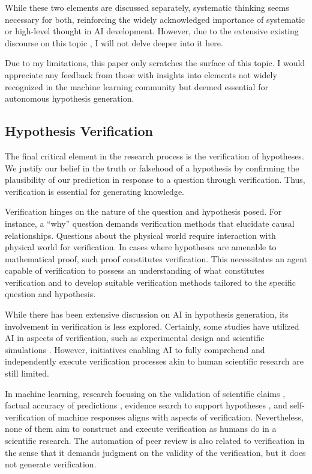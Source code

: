 \documentclass{article}
\begin{document}
While these two elements are discussed separately, systematic thinking seems necessary for both, reinforcing the widely acknowledged importance of systematic or high-level thought in AI development. However, due to the extensive existing discourse on this topic \cite{goyal2022inductive}, I will not delve deeper into it here.

Due to my limitations, this paper only scratches the surface of this topic. I would appreciate any feedback from those with insights into elements not widely recognized in the machine learning community but deemed essential for autonomous hypothesis generation.

\subsection{Hypothesis Verification}
\label{section-hypothesis-verification}
The final critical element in the research process is the verification of hypotheses. We justify our belief in the truth or falsehood of a hypothesis by confirming the plausibility of our prediction in response to a question through verification. Thus, verification is essential for generating knowledge.

Verification hinges on the nature of the question and hypothesis posed. For instance, a ``why'' question demands verification methods that elucidate causal relationships. Questions about the physical world require interaction with physical world for verification. In cases where hypotheses are amenable to mathematical proof, such proof constitutes verification. This necessitates an agent capable of verification to possess an understanding of what constitutes verification and to develop suitable verification methods tailored to the specific question and hypothesis.

While there has been extensive discussion on AI in hypothesis generation, its involvement in verification is less explored. Certainly, some studies have utilized AI in aspects of verification, such as experimental design \cite{chaloner1995bayesian} and scientific simulations \cite{baker2019basic}. However, initiatives enabling AI to fully comprehend and independently execute verification processes akin to human scientific research are still limited. 

In machine learning, research focusing on the validation of scientific claims \cite{wadden2020fact}, factual accuracy of predictions \cite{guo2022survey}, evidence search to support hypotheses \cite{koneru2023can}, and self-verification of machine responses \cite{dhuliawala2023chain} aligns with aspects of verification. Nevertheless, none of them aim to construct and execute verification as humans do in a scientific research. The automation of peer review \cite{kousha2022artificial,lin2021automated} is also related to verification in the sense that it demands judgment on the validity of the verification, but it does not generate verification.
\end{document}
